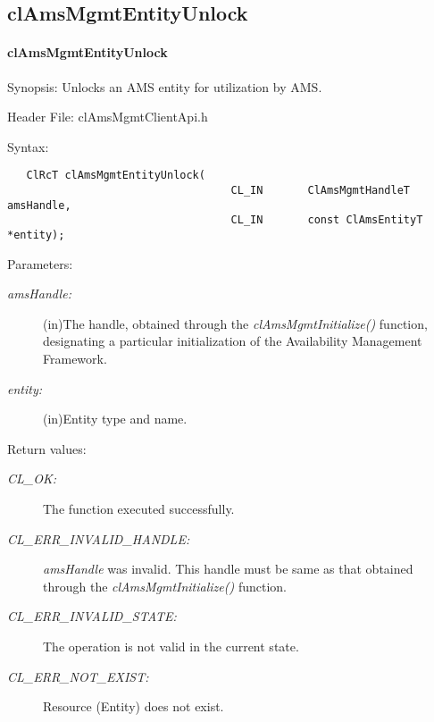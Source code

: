\subsection{clAmsMgmtEntityUnlock}
\hypertarget{pageams112}{}\paragraph{cl\-Ams\-Mgmt\-Entity\-Unlock}\label{pageams112}
\begin{Desc}
\item[Synopsis:]Unlocks an AMS entity for utilization by AMS.\end{Desc}
\begin{Desc}
\item[Header File:]clAmsMgmtClientApi.h\end{Desc}
\begin{Desc}
\item[Syntax:]

\footnotesize\begin{verbatim}   ClRcT clAmsMgmtEntityUnlock(
	                               CL_IN       ClAmsMgmtHandleT            amsHandle,
	                               CL_IN       const ClAmsEntityT          *entity);
\end{verbatim}
\normalsize
\end{Desc}
\begin{Desc}
\item[Parameters:]
\begin{description}
\item[{\em ams\-Handle:}](in)The handle, obtained through the \textit{clAmsMgmtInitialize()} function, designating a particular 
initialization of the Availability Management Framework. \item[{\em entity:}](in)Entity type and name.\end{description}
\end{Desc}
\begin{Desc}
\item[Return values:]
\begin{description}
\item[{\em CL\_\-OK:}]The function executed successfully. \item[{\em CL\_\-ERR\_\-INVALID\_\-HANDLE:}]{\em ams\-Handle\/} was invalid.
This handle must be same as that obtained through the \textit{clAmsMgmtInitialize()} function. \item[{\em CL\_\-ERR\_\-INVALID\_\-STATE:}]The operation is not valid in the current state. \item[{\em CL\_\-ERR\_\-NOT\_\-EXIST:}]Resource (Entity) does not exist.\end{description}
\end{Desc}
